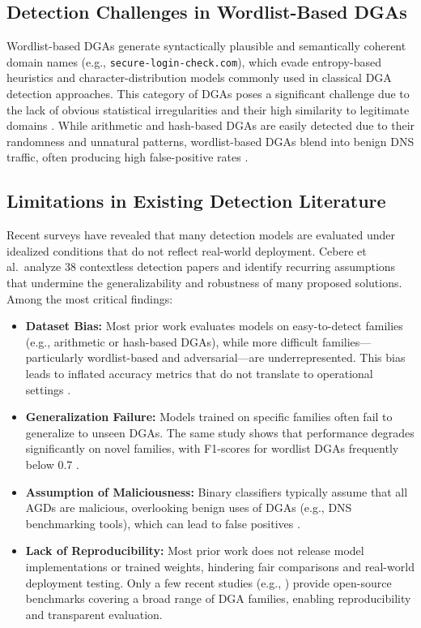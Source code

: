 \documentclass[a4paper]{llncs}
\begin{document}
\subsection{Detection Challenges in Wordlist-Based DGAs}

Wordlist-based DGAs generate syntactically plausible and semantically coherent domain names (e.g., \texttt{secure-login-check.com}), which evade entropy-based heuristics and character-distribution models commonly used in classical DGA detection approaches. This category of DGAs poses a significant challenge due to the lack of obvious statistical irregularities and their high similarity to legitimate domains \cite{plohmann2016comprehensive,cebere2024down}. While arithmetic and hash-based DGAs are easily detected due to their randomness and unnatural patterns, wordlist-based DGAs blend into benign DNS traffic, often producing high false-positive rates \cite{yu2018character}.

\subsection{Limitations in Existing Detection Literature}

Recent surveys \cite{cebere2024down} have revealed that many detection models are evaluated under idealized conditions that do not reflect real-world deployment. Cebere et al.\ analyze 38 contextless detection papers and identify recurring assumptions that undermine the generalizability and robustness of many proposed solutions. Among the most critical findings:

\begin{itemize}
    
    \item \textbf{Dataset Bias:} Most prior work evaluates models on easy-to-detect families (e.g., arithmetic or hash-based DGAs), while more difficult families—particularly wordlist-based and adversarial—are underrepresented. This bias leads to inflated accuracy metrics that do not translate to operational settings \cite{cebere2024down}.
    
    \item \textbf{Generalization Failure:} Models trained on specific families often fail to generalize to unseen DGAs. The same study shows that performance degrades significantly on novel families, with F1-scores for wordlist DGAs frequently below 0.7 \cite{cebere2024down}.
    
    \item \textbf{Assumption of Maliciousness:} Binary classifiers typically assume that all AGDs are malicious, overlooking benign uses of DGAs (e.g., DNS benchmarking tools), which can lead to false positives \cite{antonakakis2012throw}.

    \item \textbf{Lack of Reproducibility:} Most prior work does not release model implementations or trained weights, hindering fair comparisons and real-world deployment testing. Only a few recent studies (e.g., \cite{cebere2024down}) provide open-source benchmarks covering a broad range of DGA families, enabling reproducibility and transparent evaluation.
    
\end{itemize}
\end{document}
